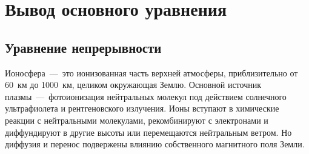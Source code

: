 \documentclass[12pt, a5paper, fleqn, twoside]{article}
\theoremstyle{definiton}
\theoremstyle{definition}
\begin{document}












\newpage

\setcounter{page}{2}



\newpage


\section*{Вывод основного уравнения}

\subsection*{Уравнение непрерывности}

Ионосфера~---~это ионизованная часть верхней атмосферы, приблизительно от 60~км до 1000~км, целиком окружающая Землю. Основной источник плазмы~---~фотоионизация нейтральных молекул под действием солнечного ультрафиолета и рентгеновского излучения. Ионы вступают в химические реакции с нейтральными молекулами, рекомбинируют с электронами и диффундируют в другие высоты или перемещаются нейтральным ветром. Но диффузия и перенос подвержены влиянию собственного магнитного поля Земли.
\end{document}

